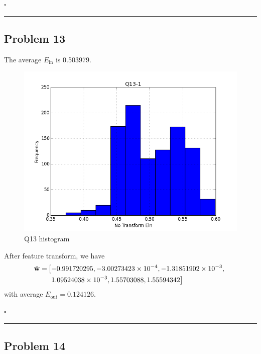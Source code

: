 \documentclass[12pt]{article}
\newcommand*{\QEDB}{\hfill\ensuremath{\square}}
\newcommand{\BF}[1]{{\bf#1}}
\newcommand{\SciNum}[2]{#1\times{10}^{#2}}
\newcommand{\horrule}[1]{\rule{\linewidth}{#1}}
\begin{document}
\QEDB

\horrule{0.5pt}

\subsection*{Problem 13}

The average $E_{\text{in}}$ is 0.503979.
\begin{figure}[h]
	\centering
	\includegraphics[scale=0.3]{Q13-1.png}
	\caption{Q13 histogram}
	\label{Q13}
\end{figure}

After feature transform, we have
\begin{align}
\tilde{\BF{w}}=&\left[-0.991720295,\SciNum{-3.00273423}{-4},\SciNum{-1.31851902}{-3},\right.\\
\nonumber
&~\left.\SciNum{1.09524038}{-3},1.55703088,1.55594342\right]
\end{align}
with average $E_{\text{out}}=0.124126$.

\QEDB

\horrule{0.5pt}

\subsection*{Problem 14}
\end{document}
